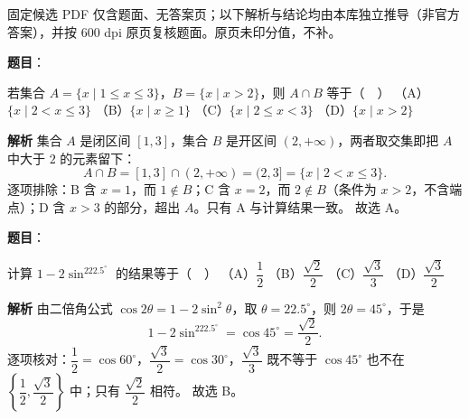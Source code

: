 \begin{gktip}
固定候选 PDF 仅含题面、无答案页；以下解析与结论均由本库独立推导（非官方答案），并按 600 dpi 原页复核题面。原页未印分值，不补。
\end{gktip}

\begin{answer}

\textbf{题目}：

若集合 $A=\{x\mid1\leqslant x\leqslant3\}$，$B=\{x\mid x>2\}$，则 $A\cap B$ 等于（　）
（A）$\{x\mid2<x\leqslant3\}$
（B）$\{x\mid x\geqslant1\}$
（C）$\{x\mid2\leqslant x<3\}$
（D）$\{x\mid x>2\}$

\textbf{解析}
集合 $A$ 是闭区间 $[1,3]$，集合 $B$ 是开区间 $(2,+\infty)$，两者取交集即把 $A$ 中大于 $2$ 的元素留下：
\nopagebreak[4]
\[A\cap B=[1,3]\cap(2,+\infty)=(2,3]=\{x\mid2<x\leqslant3\}.\]
逐项排除：B 含 $x=1$，而 $1\notin B$；C 含 $x=2$，而 $2\notin B$（条件为 $x>2$，不含端点）；D 含 $x>3$ 的部分，超出 $A$。只有 A 与计算结果一致。
故选 A。


\end{answer}
\begin{answer}

\textbf{题目}：

计算 $1-2\sin^222.5^\circ$ 的结果等于（　）
（A）$\dfrac12$
（B）$\dfrac{\sqrt2}{2}$
（C）$\dfrac{\sqrt3}{3}$
（D）$\dfrac{\sqrt3}{2}$

\textbf{解析}
由二倍角公式 $\cos2\theta=1-2\sin^2\theta$，取 $\theta=22.5^\circ$，则 $2\theta=45^\circ$，于是
\nopagebreak[4]
\[1-2\sin^222.5^\circ=\cos45^\circ=\frac{\sqrt2}{2}.\]
逐项核对：$\dfrac12=\cos60^\circ$，$\dfrac{\sqrt3}{2}=\cos30^\circ$，$\dfrac{\sqrt3}{3}$ 既不等于 $\cos45^\circ$ 也不在 $\left\{\dfrac12,\dfrac{\sqrt3}{2}\right\}$ 中；只有 $\dfrac{\sqrt2}{2}$ 相符。
故选 B。


\end{answer}
